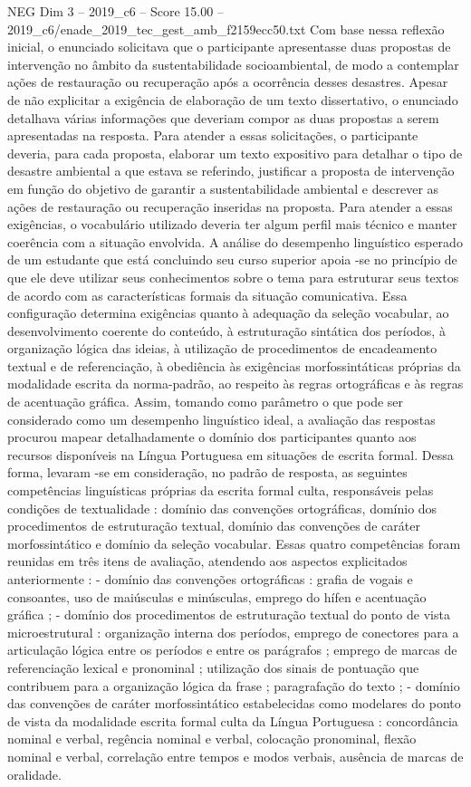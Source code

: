 \begin{textsample}{NEG Dim 3 – 2019\_c6 – Score 15.00 – 2019\_c6/enade\_2019\_tec\_gest\_amb\_f2159ecc50.txt}
Com base nessa reflexão inicial, o enunciado solicitava que o participante apresentasse duas propostas de intervenção no âmbito da sustentabilidade socioambiental, de modo a contemplar ações de restauração ou recuperação após a ocorrência desses desastres.
Apesar de não explicitar a exigência de elaboração de um texto dissertativo, o enunciado detalhava várias informações que deveriam compor as duas propostas a serem apresentadas na resposta.
Para atender a essas solicitações, o participante deveria, para cada proposta, elaborar um texto expositivo para detalhar o tipo de desastre ambiental a que estava se referindo, justificar a proposta de intervenção em função do objetivo de garantir a sustentabilidade ambiental e descrever as ações de restauração ou recuperação inseridas na proposta.
Para atender a essas exigências, o vocabulário utilizado deveria ter algum perfil mais técnico e manter coerência com a situação envolvida.
A análise do desempenho linguístico esperado de um estudante que está concluindo seu curso superior apoia -se no princípio de que ele deve utilizar seus conhecimentos sobre o tema para estruturar seus textos de acordo com as características formais da situação comunicativa.
Essa configuração determina exigências quanto à adequação da seleção vocabular, ao desenvolvimento coerente do conteúdo, à estruturação sintática dos períodos, à organização lógica das ideias, à utilização de procedimentos de encadeamento textual e de referenciação, à obediência às exigências morfossintáticas próprias da modalidade escrita da norma-padrão, ao respeito às regras ortográficas e às regras de acentuação gráfica.
Assim, tomando como parâmetro o que pode ser considerado como um desempenho linguístico ideal, a avaliação das respostas procurou mapear detalhadamente o domínio dos participantes quanto aos recursos disponíveis na Língua Portuguesa em situações de escrita formal.
Dessa forma, levaram -se em consideração, no padrão de resposta, as seguintes competências linguísticas próprias da escrita formal culta, responsáveis pelas condições de textualidade : domínio das convenções ortográficas, domínio dos procedimentos de estruturação textual, domínio das convenções de caráter morfossintático e domínio da seleção vocabular.
Essas quatro competências foram reunidas em três itens de avaliação, atendendo aos aspectos explicitados anteriormente : - domínio das convenções ortográficas : grafia de vogais e consoantes, uso de maiúsculas e minúsculas, emprego do hífen e acentuação gráfica ; - domínio dos procedimentos de estruturação textual do ponto de vista microestrutural : organização interna dos períodos, emprego de conectores para a articulação lógica entre os períodos e entre os parágrafos ; emprego de marcas de referenciação lexical e pronominal ; utilização dos sinais de pontuação que contribuem para a organização lógica da frase ; paragrafação do texto ; - domínio das convenções de caráter morfossintático estabelecidas como modelares do ponto de vista da modalidade escrita formal culta da Língua Portuguesa : concordância nominal e verbal, regência nominal e verbal, colocação pronominal, flexão nominal e verbal, correlação entre tempos e modos verbais, ausência de marcas de oralidade.

\end{textsample}
